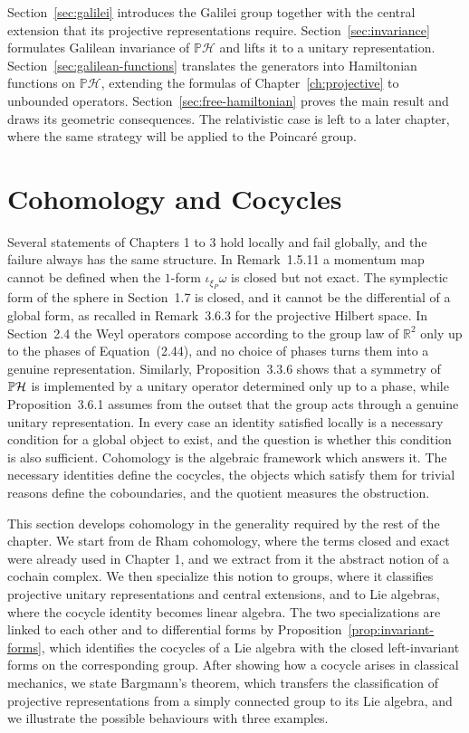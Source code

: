 Section~\ref{sec:galilei} introduces the Galilei group together with the central extension that its projective representations require. Section~\ref{sec:invariance} formulates Galilean invariance of $\mathbb{P}\mathcal{H}$ and lifts it to a unitary representation. Section~\ref{sec:galilean-functions} translates the generators into Hamiltonian functions on $\mathbb{P}\mathcal{H}$, extending the formulas of Chapter~\ref{ch:projective} to unbounded operators. Section~\ref{sec:free-hamiltonian} proves the main result and draws its geometric consequences. The relativistic case is left to a later chapter, where the same strategy will be applied to the Poincaré group.

\section{Cohomology and Cocycles}\label{sec:cohomology}

Several statements of Chapters 1 to 3 hold locally and fail globally, and the failure always has the same structure. In Remark~1.5.11 a momentum map cannot be defined when the $1$-form $\iota_{\xi_P}\omega$ is closed but not exact. The symplectic form of the sphere in Section~1.7 is closed, and it cannot be the differential of a global form, as recalled in Remark~3.6.3 for the projective Hilbert space. In Section~2.4 the Weyl operators compose according to the group law of $\mathbb{R}^2$ only up to the phases of Equation~(2.44), and no choice of phases turns them into a genuine representation. Similarly, Proposition~3.3.6 shows that a symmetry of $\mathbb{P}\H$ is implemented by a unitary operator determined only up to a phase, while Proposition~3.6.1 assumes from the outset that the group acts through a genuine unitary representation. In every case an identity satisfied locally is a necessary condition for a global object to exist, and the question is whether this condition is also sufficient. Cohomology is the algebraic framework which answers it. The necessary identities define the cocycles, the objects which satisfy them for trivial reasons define the coboundaries, and the quotient measures the obstruction.

This section develops cohomology in the generality required by the rest of the chapter. We start from de Rham cohomology, where the terms closed and exact were already used in Chapter 1, and we extract from it the abstract notion of a cochain complex. We then specialize this notion to groups, where it classifies projective unitary representations and central extensions, and to Lie algebras, where the cocycle identity becomes linear algebra. The two specializations are linked to each other and to differential forms by Proposition~\ref{prop:invariant-forms}, which identifies the cocycles of a Lie algebra with the closed left-invariant forms on the corresponding group. After showing how a cocycle arises in classical mechanics, we state Bargmann's theorem, which transfers the classification of projective representations from a simply connected group to its Lie algebra, and we illustrate the possible behaviours with three examples.

